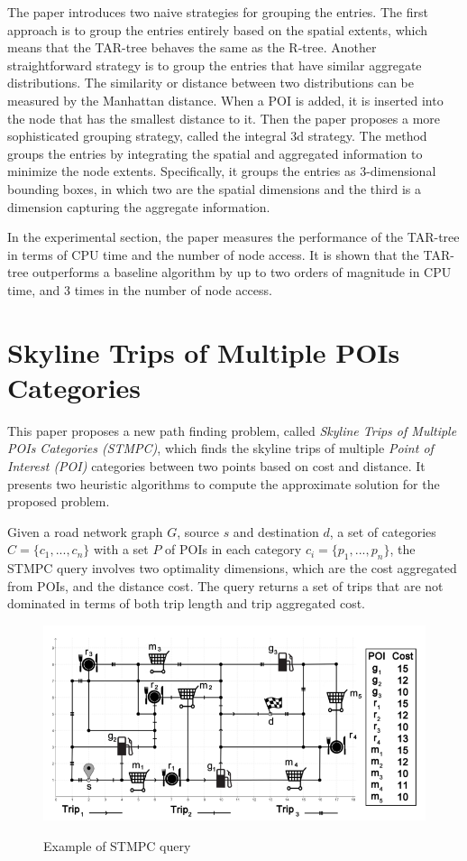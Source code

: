 \documentclass[paper=a4, fontsize=18pt]{article} %
\numberwithin{equation}{section} %
\numberwithin{figure}{section} %
\numberwithin{table}{section} %
\begin{document}
The paper introduces two naive strategies for grouping the entries. The first approach is to group the entries entirely based on the spatial extents, which means that the TAR-tree behaves the same as the R-tree. Another straightforward strategy is to group the entries that have similar aggregate distributions. The similarity or distance between two distributions can be measured by the Manhattan distance. When a POI is added, it is inserted into the node that has the smallest distance to it. Then the paper proposes a more sophisticated grouping strategy, called the integral 3d strategy. The method groups the entries by integrating the spatial and aggregated information to minimize the node extents. Specifically, it groups the entries as 3-dimensional bounding boxes, in which two are the spatial dimensions and the third is a dimension capturing the aggregate information.

In the experimental section, the paper measures the performance of the TAR-tree in terms of CPU time and the number of node access. It is shown that the TAR-tree outperforms a baseline algorithm by up to two orders of magnitude in CPU time, and 3 times in the number of node access.

\section{Skyline Trips of Multiple POIs Categories \cite{AHZ15}}

This paper proposes a new path finding problem, called \emph{Skyline Trips of Multiple POIs Categories (STMPC)}, which finds the skyline trips of multiple \emph{Point of Interest (POI)} categories between two points based on cost and distance. It presents two heuristic algorithms to compute the approximate solution for the proposed problem.

Given a road network graph $G$, source $s$ and destination $d$, a set of categories $C = \{c_1,...,c_n\}$ with a set $P$ of POIs in each category $c_i = \{p_1, ..., p_n\}$, the STMPC query involves two optimality dimensions, which are the cost aggregated from POIs, and the distance cost. The query returns a set of trips that are not dominated in terms of both trip length and trip aggregated cost.

\begin{figure}[h]
  \centering
  \includegraphics[width=.6\linewidth]{8_15_skyline.png}\\
  \caption{Example of STMPC query}\label{fig:STMPC}
\end{figure}
\end{document}
